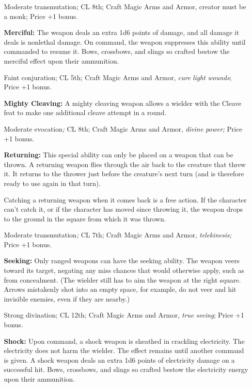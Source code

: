 Moderate transmutation; CL 8th; Craft Magic Arms and Armor, creator must be a monk; 
Price +1 bonus.

\textbf{Merciful: }The weapon deals an extra 1d6 points of damage, and all damage 
it deals is nonlethal damage. On command, the weapon suppresses this ability until 
commanded to resume it. Bows, crossbows, and slings so crafted bestow the merciful 
effect upon their ammunition.

Faint conjuration; CL 5th; Craft Magic Arms and Armor, \textit{cure light wounds}; 
Price +1 bonus.

\textbf{Mighty Cleaving:} A mighty cleaving weapon allows a wielder with the Cleave 
feat to make one additional cleave attempt in a round.

Moderate evocation\textit{; }CL 8th; Craft Magic Arms and Armor, \textit{divine 
power; }Price +1 bonus.

\textbf{Returning:} This special ability can only be placed on a weapon that can 
be thrown. A returning weapon flies through the air back to the creature that threw 
it. It returns to the thrower just before the creature's next turn (and is therefore 
ready to use again in that turn).

Catching a returning weapon when it comes back is a free action. If the character 
can't catch it, or if the character has moved since throwing it, the weapon drops 
to the ground in the square from which it was thrown.

Moderate transmutation\textit{; }CL 7th; Craft Magic Arms and Armor, \textit{telekinesis; 
}Price +1 bonus.

\textbf{Seeking:} Only ranged weapons can have the seeking ability. The weapon 
veers toward its target, negating any miss chances that would otherwise apply, 
such as from concealment. (The wielder still has to aim the weapon at the right 
square. Arrows mistakenly shot into an empty space, for example, do not veer and 
hit invisible enemies, even if they are nearby.)

Strong divination; CL 12th; Craft Magic Arms and Armor, \textit{true seeing}; Price 
+1 bonus.

\textbf{Shock:} Upon command, a shock weapon is sheathed in crackling electricity. 
The electricity does not harm the wielder. The effect remains until another command 
is given. A shock weapon deals an extra 1d6 points of electricity damage on a successful 
hit. Bows, crossbows, and slings so crafted bestow the electricity energy upon 
their ammunition.


